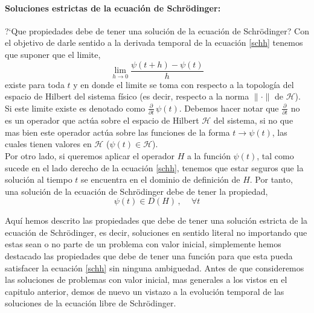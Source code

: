\documentclass[12pt]{book}
\numberwithin{equation}{chapter}
\def\rar{\rightarrow}
\def\H{\mathcal{H}}
\begin{document}
\paragraph{Soluciones estrictas de la ecuaci\'on de Schr\"odinger: }
?`Que propiedades debe de tener una soluci\'on de la ecuaci\'on de Schr\"odinger? Con el objetivo de darle sentido a la derivada temporal de la ecuaci\'on \eqref{schh} tenemos que suponer que el limite,
\begin{equation}\label{dift}
\lim_{h \rar 0} \frac{ \psi(t+h) - \psi(t) }{h}
\end{equation}
existe para toda $t$ y en donde el limite se toma con respecto a la topolog\'ia del espacio de Hilbert del sistema f\'isico (es decir, respecto a la norma $\| \cdot \|$ de $\H$). Si este limite existe es denotado como $ \frac{\partial}{\partial t} \, \psi(t) $. Debemos hacer notar que $\frac{\partial}{\partial t}$ no es un operador que act\'ua sobre el espacio de Hilbert $\H$ del sistema, si no que mas bien este operador act\'ua sobre las funciones de la forma $t \rar \psi(t)$, las cuales tienen valores en $\H$ ($\psi(t) \in \H$).\\

Por otro lado, si queremos aplicar el operador $H$ a la funci\'on $\psi (t)$, tal como sucede en el lado derecho de la ecuaci\'on \eqref{schh}, tenemos que estar seguros que la soluci\'on al tiempo $t$ se encuentra en el dominio de definici\'on de $H$. Por tanto, una soluci\'on de la ecuaci\'on de Schr\"odinger debe de tener la propiedad,  
\begin{equation}
\psi (t) \in D(H) \,,\,\,\,\,\,\,\, \forall t
\end{equation}

Aqu\'i hemos descrito las propiedades que debe de tener una soluci\'on estricta de la ecuaci\'on de Schr\"odinger, es decir, soluciones en sentido literal no importando que estas sean o no parte de un problema con valor inicial, simplemente hemos destacado las propiedades que debe de tener una funci\'on para que esta pueda satisfacer la ecuaci\'on \eqref{schh} sin ninguna ambiguedad. Antes de que consideremos las soluciones de problemas con valor inicial, mas generales a los vistos en el capitulo anterior, demos de nuevo un vistazo a la evoluci\'on temporal de las soluciones de la ecuaci\'on libre de Schr\"odinger.
\end{document}
